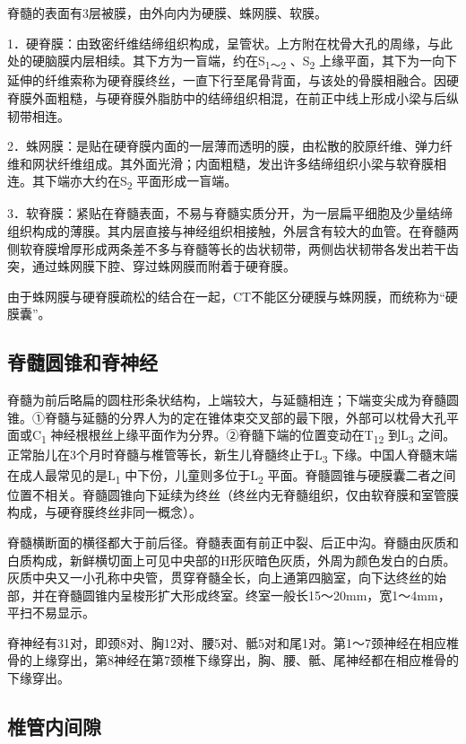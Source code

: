 脊髓的表面有3层被膜，由外向内为硬膜、蛛网膜、软膜。

1．硬脊膜：由致密纤维结缔组织构成，呈管状。上方附在枕骨大孔的周缘，与此处的硬脑膜内层相续。其下方为一盲端，约在S\textsubscript{1～2}
、S\textsubscript{2}
上缘平面，其下为一向下延伸的纤维索称为硬脊膜终丝，一直下行至尾骨背面，与该处的骨膜相融合。因硬脊膜外面粗糙，与硬脊膜外脂肪中的结缔组织相混，在前正中线上形成小梁与后纵韧带相连。

2．蛛网膜：是贴在硬脊膜内面的一层薄而透明的膜，由松散的胶原纤维、弹力纤维和网状纤维组成。其外面光滑；内面粗糙，发出许多结缔组织小梁与软脊膜相连。其下端亦大约在S\textsubscript{2}
平面形成一盲端。

3．软脊膜：紧贴在脊髓表面，不易与脊髓实质分开，为一层扁平细胞及少量结缔组织构成的薄膜。其内层直接与神经组织相接触，外层含有较大的血管。在脊髓两侧软脊膜增厚形成两条差不多与脊髓等长的齿状韧带，两侧齿状韧带各发出若干齿突，通过蛛网膜下腔、穿过蛛网膜而附着于硬脊膜。

由于蛛网膜与硬脊膜疏松的结合在一起，CT不能区分硬膜与蛛网膜，而统称为“硬膜囊”。

\subsection{脊髓圆锥和脊神经}

脊髓为前后略扁的圆柱形条状结构，上端较大，与延髓相连；下端变尖成为脊髓圆锥。①脊髓与延髓的分界人为的定在锥体束交叉部的最下限，外部可以枕骨大孔平面或C\textsubscript{1}
神经根根丝上缘平面作为分界。②脊髓下端的位置变动在T\textsubscript{12}
到L\textsubscript{3}
之间。正常胎儿在3个月时脊髓与椎管等长，新生儿脊髓终止于L\textsubscript{3}
下缘。中国人脊髓末端在成人最常见的是L\textsubscript{1}
中下份，儿童则多位于L\textsubscript{2}
平面。脊髓圆锥与硬膜囊二者之间位置不相关。脊髓圆锥向下延续为终丝（终丝内无脊髓组织，仅由软脊膜和室管膜构成，与硬脊膜终丝非同一概念）。

脊髓横断面的横径都大于前后径。脊髓表面有前正中裂、后正中沟。脊髓由灰质和白质构成，新鲜横切面上可见中央部的H形灰暗色灰质，外周为颜色发白的白质。灰质中央又一小孔称中央管，贯穿脊髓全长，向上通第四脑室，向下达终丝的始部，并在脊髓圆锥内呈梭形扩大形成终室。终室一般长15～20mm，宽1～4mm，平扫不易显示。

脊神经有31对，即颈8对、胸12对、腰5对、骶5对和尾1对。第1～7颈神经在相应椎骨的上缘穿出，第8神经在第7颈椎下缘穿出，胸、腰、骶、尾神经都在相应椎骨的下缘穿出。

\subsection{椎管内间隙}

